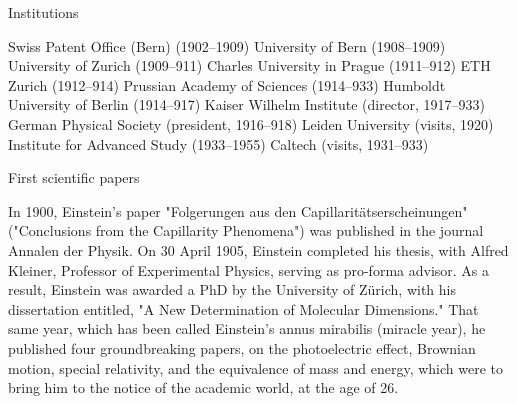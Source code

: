\begin{small}
Institutions 	

    Swiss Patent Office (Bern) (1902--1909)
    University of Bern (1908--1909)
    University of Zurich (1909--911)
    Charles University in Prague (1911--912)
    ETH Zurich (1912--914)
    Prussian Academy of Sciences (1914--933)
    Humboldt University of Berlin (1914--917)
    Kaiser Wilhelm Institute (director, 1917--933)
    German Physical Society (president, 1916--918)
    Leiden University (visits, 1920)
    Institute for Advanced Study (1933--1955)
    Caltech (visits, 1931--933)
    
First scientific papers

In 1900, Einstein's paper "Folgerungen aus den 
Capillaritätserscheinungen" ("Conclusions from the 
Capillarity Phenomena") was published in the journal 
Annalen der Physik. On 30 April 1905, Einstein 
completed his thesis,  with Alfred Kleiner, Professor of 
Experimental Physics, serving as pro-forma advisor. As a 
result, Einstein was awarded a PhD by the University of 
Zürich, with his dissertation entitled, "A New Determination 
of Molecular Dimensions."  That same year, which has been 
called Einstein's annus mirabilis (miracle year), he 
published four groundbreaking papers, on the photoelectric 
effect, Brownian motion, special relativity, and the 
equivalence of mass and energy, which were to bring him to 
the notice of the academic world, at the age of 26.
\end{small}

